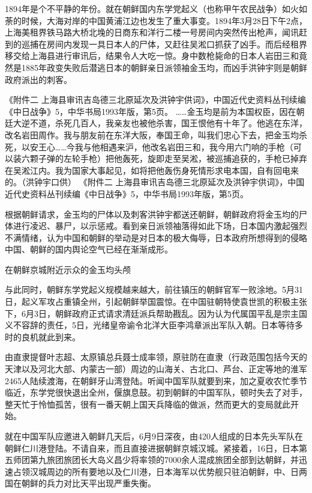 \documentclass[12pt,UTF8]{ctexbook}
\begin{document}
1894年是个不平静的年份。就在朝鲜国内东学党起义（也称甲午农民战争）如火如荼的时候，大海对岸的中国黄浦江边也发生了重大事变。1894年3月28日下午2点，上海美租界铁马路大桥北堍的日商东和洋行二楼一号房间内突然传出枪声，闻讯赶到的巡捕在房间内发现一具日本人的尸体，又赶往吴淞口抓获了凶手。而后经租界移交给上海县进行审讯后，结果令人大吃一惊。身中数枪毙命的日本人岩田三和竟然是1885年政变失败后潜逃日本的朝鲜亲日派领袖金玉均，而凶手洪钟宇则是朝鲜政府派出的刺客。

《附件二 上海县审讯吉岛德三北原延次及洪钟宇供词》，中国近代史资料丛刊续编《中日战争》5，中华书局1993年版，第5页。
……金玉均是前为本国权臣，因在朝廷大逆不道，杀死几百人，我亲友也被他杀害，国王恨他有十年了。他逃在东洋，改名岩田周作。我与朋友前在东洋大阪，奉国王命，叫我们忠心下去，把金玉均杀死，以安王心……今我与他相遇来沪，他改名岩田三和，我今用六门响的手枪（可以装六颗子弹的左轮手枪）把他轰死，旋即走至吴淞，被巡捕追获的，手枪已掉弃在吴淞江内。我为国家大事起见，如将把他轰伤身死情形求电本国，自有回电来的。（洪钟宇口供） 《附件二 上海县审讯吉岛德三北原延次及洪钟宇供词》，中国近代史资料丛刊续编《中日战争》5，中华书局1993年版，第5页。

根据朝鲜请求，金玉均的尸体以及刺客洪钟宇都送还朝鲜，朝鲜政府将金玉均的尸体进行凌迟、暴尸，以示惩戒。看到亲日派领袖落得如此下场，日本国内激起强烈不满情绪，认为中国和朝鲜的举动是对日本的极大侮辱，日本政府所想得到的侵略中国、朝鲜的国内舆论空气已经在渐渐成形。


在朝鲜京城附近示众的金玉均头颅

与此同时，朝鲜东学党起义规模越来越大，前往镇压的朝鲜官军一败涂地。5月31日，起义军攻占重镇全州，引起朝鲜举国震惊。在中国驻朝特使袁世凯的积极主张下，6月3日，朝鲜政府正式请求清廷派兵帮助戡乱。因为认为代属国平乱是宗主国义不容辞的责任，5日，光绪皇帝谕令北洋大臣李鸿章派出军队入朝。日本等待多时的良机就此到来。

由直隶提督叶志超、太原镇总兵聂士成率领，原驻防在直隶（行政范围包括今天的天津以及河北大部、内蒙古一部）周边的山海关、古北口、芦台、正定等地的淮军2465人陆续渡海，在朝鲜牙山湾登陆。听闻中国军队就要到来，加之夏收农忙季节临近，东学党很快退出全州，偃旗息鼓。初到朝鲜的中国军队，顿时失去了对手，整天忙于怜恤孤苦，很有一番天朝上国天兵降临的做派，然而更大的变局就此开始。

就在中国军队应邀进入朝鲜几天后，6月9日深夜，由420人组成的日本先头军队在朝鲜仁川港登陆。不请自来，而且直接进据朝鲜京城汉城。紧接着，16日，日本第五师团第九旅团旅团长大岛义昌少将率领的7000余人混成旅团全部到达朝鲜，并迅速占领汉城周边的所有要地以及仁川港，日本海军以优势舰只驻泊朝鲜，中、日两国在朝鲜的兵力对比天平出现严重失衡。
\end{document}
